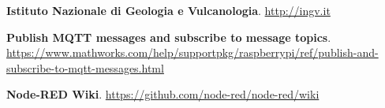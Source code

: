 \documentclass[a4paper,10pt]{memoir}
\begin{document}
\begin{thebibliography}{9}

  \textbf{Istituto Nazionale di Geologia e Vulcanologia}.
  \href{http://ingv.it}{http://ingv.it}

  \textbf{Publish MQTT messages and subscribe to message topics}.\\
  \href{https://www.mathworks.com/help/supportpkg/raspberrypi/ref/publish-and-subscribe-to-mqtt-messages.html}{https://www.mathworks.com/help/supportpkg/raspberrypi/ref/publish-and-subscribe-to-mqtt-messages.html}

  \textbf{Node-RED Wiki}.
  \href{https://github.com/node-red/node-red/wiki}{https://github.com/node-red/node-red/wiki}
\end{thebibliography}
\end{document}
